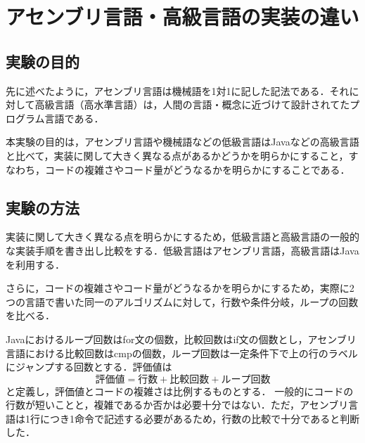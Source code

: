 \chapter{アセンブリ言語・高級言語の実装の違い}\label{cha2}
\section{実験の目的}
先に述べたように，アセンブリ言語は機械語を1対1に記した記法である．それに対して高級言語（高水準言語）は，人間の言語・概念に近づけて設計されてたプログラム言語である．\cite{高水準言語}\par
本実験の目的は，アセンブリ言語や機械語などの低級言語は{\ttfamily Java}などの高級言語と比べて，実装に関して大きく異なる点があるかどうかを明らかにすること，すなわち，コードの複雑さやコード量がどうなるかを明らかにすることである．
\section{実験の方法}
実装に関して大きく異なる点を明らかにするため，低級言語と高級言語の一般的な実装手順を書き出し比較をする．低級言語はアセンブリ言語，高級言語は{\ttfamily Java}を利用する．\par
さらに，コードの複雑さやコード量がどうなるかを明らかにするため，実際に2つの言語で書いた同一のアルゴリズムに対して，行数や条件分岐，ループの回数を比べる．\par
{\ttfamily Java}におけるループ回数は{\ttfamily for}文の個数，比較回数は{\ttfamily if}文の個数とし，アセンブリ言語における比較回数は{\ttfamily cmp}の個数，ループ回数は一定条件下で上の行のラベルにジャンプする回数とする．評価値は
\[評価値=行数+比較回数+ループ回数\]と定義し，評価値とコードの複雑さは比例するものとする．
一般的にコードの行数が短いことと，複雑であるか否かは必要十分ではない．ただ，アセンブリ言語は1行につき1命令で記述する必要があるため，行数の比較で十分であると判断した．
